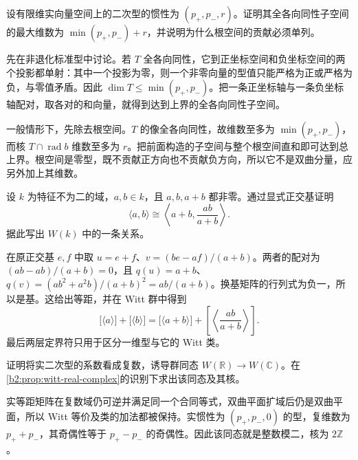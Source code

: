\begin{exercise}\label{b2:ex:10-real-isotropic-dimension}
	设有限维实向量空间上的二次型的惯性为 \((p_+,p_-,r)\)。证明其全各向同性子空间的最大维数为 \(\min(p_+,p_-)+r\)，并说明为什么根空间的贡献必须单列。
\end{exercise}
\begin{solution}
	先在非退化标准型中讨论。若 \(T\) 全各向同性，它到正坐标空间和负坐标空间的两个投影都单射：其中一个投影为零，则一个非零向量的型值只能严格为正或严格为负，与零值矛盾。因此 \(\dim T\le\min(p_+,p_-)\)。把一条正坐标轴与一条负坐标轴配对，取各对的和向量，就得到达到上界的全各向同性子空间。

	一般情形下，先除去根空间。\(T\) 的像全各向同性，故维数至多为 \(\min(p_+,p_-)\)，而核 \(T\cap\operatorname{rad}b\) 维数至多为 \(r\)。把前面构造的子空间与整个根空间直和即可达到总上界。根空间是零型，既不贡献正方向也不贡献负方向，所以它不是双曲分量，应另外加上其维数。
\end{solution}

\begin{exercise}\label{b2:ex:10-witt-binary-relation}
	设 \(k\) 为特征不为二的域，\(a,b\in k\)，且 \(a,b,a+b\) 都非零。通过显式正交基证明
	\[
		\langle a,b\rangle\cong\left\langle a+b,\frac{ab}{a+b}\right\rangle.
	\]
	据此写出 \(W(k)\) 中的一条关系。
\end{exercise}
\begin{solution}
	在原正交基 \(e,f\) 中取 \(u=e+f\)、\(v=(be-af)/(a+b)\)。两者的配对为 \((ab-ab)/(a+b)=0\)，且 \(q(u)=a+b\)、\(q(v)=(ab^2+a^2b)/(a+b)^2=ab/(a+b)\)。换基矩阵的行列式为负一，所以是基。这给出等距，并在 Witt 群中得到
	\[
		\bigl[\langle a\rangle\bigr]+\bigl[\langle b\rangle\bigr] =\bigl[\langle a+b\rangle\bigr]+\left[\left\langle\frac{ab}{a+b}\right\rangle\right].
	\]
	最后两层定界符只用于区分一维型与它的 Witt 类。
\end{solution}

\begin{exercise}\label{b2:ex:10-real-complex-witt-map}
	证明将实二次型的系数看成复数，诱导群同态 \(W(\mathbb R)\to W(\mathbb C)\)。在\cref{b2:prop:witt-real-complex}的识别下求出该同态及其核。
\end{exercise}
\begin{solution}
	实等距矩阵在复数域仍可逆并满足同一个合同等式，双曲平面扩域后仍是双曲平面，所以 Witt 等价及类的加法都被保持。实惯性为 \((p_+,p_-,0)\) 的型，复维数为 \(p_++p_-\)，其奇偶性等于 \(p_+-p_-\) 的奇偶性。因此该同态就是整数模二，核为 \(2\mathbb Z\)。
\end{solution}

